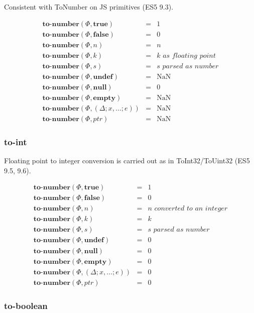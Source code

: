 \documentclass[draft, 10pt]{article}
\newcommand{\expr}[0]{e}
\newcommand{\var}[0]{x}
\newcommand{\num}[0]{n}
\newcommand{\intg}[0]{k}
\newcommand{\str}[0]{s}
\newcommand{\nan}[0]{\textrm{NaN}}
\newcommand{\undef}[0]{\textbf{undef}}
\newcommand{\nul}[0]{\textbf{null}}
\newcommand{\empt}[0]{\textbf{empty}}
\newcommand{\true}[0]{\textbf{true}}
\newcommand{\false}[0]{\textbf{false}}
\newcommand{\optonum}[0]{\textbf{to-number}}
\newcommand{\varenv}[0]{\Delta}
\newcommand{\heap}[0]{\Phi}
\newcommand{\closure}[3]{(#1; #2; #3)}
\newcommand{\heapptr}{ptr}
\newcommand{\rununop}[3]{#1(#2,#3)}
\begin{document}
Consistent with ToNumber on JS primitives (ES5 9.3).

\[
\begin{array}{rcl}
\rununop{\optonum}{\heap}{\true} &=& 1 \\
\rununop{\optonum}{\heap}{\false} &=& 0 \\
\rununop{\optonum}{\heap}{\num} &=& \num \\
\rununop{\optonum}{\heap}{\intg} &=& \textit{$\intg$ as floating point} \\
\rununop{\optonum}{\heap}{\str} &=& \textit{$\str$ parsed as number} \\
\rununop{\optonum}{\heap}{\undef} &=& \nan \\
\rununop{\optonum}{\heap}{\nul} &=& 0 \\
\rununop{\optonum}{\heap}{\empt} &=& \nan \\
\rununop{\optonum}{\heap}{\closure{\varenv}{\var, \dots}{\expr}} &=& \nan \\
\rununop{\optonum}{\heap}{\heapptr} &=& \nan 
\end{array}
\]

\subsubsection{to-int}

Floating point to integer conversion is carried out as in ToInt32/ToUint32
(ES5 9.5, 9.6).

\[
\begin{array}{rcl}
\rununop{\optonum}{\heap}{\true} &=& 1 \\
\rununop{\optonum}{\heap}{\false} &=& 0 \\
\rununop{\optonum}{\heap}{\num} &=& \textit{$\num$ converted to an integer} \\
\rununop{\optonum}{\heap}{\intg} &=& \intg \\
\rununop{\optonum}{\heap}{\str} &=& \textit{$\str$ parsed as number} \\
\rununop{\optonum}{\heap}{\undef} &=& 0 \\
\rununop{\optonum}{\heap}{\nul} &=& 0 \\
\rununop{\optonum}{\heap}{\empt} &=& 0 \\
\rununop{\optonum}{\heap}{\closure{\varenv}{\var, \dots}{\expr}} &=& 0 \\
\rununop{\optonum}{\heap}{\heapptr} &=& 0
\end{array}
\]

\subsubsection{to-boolean}
\end{document}
